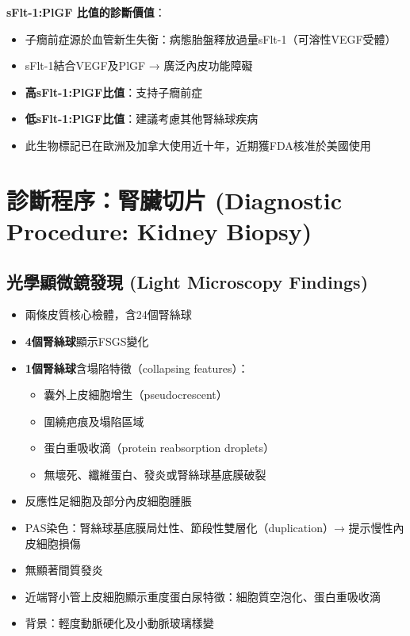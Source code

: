 \documentclass[12pt,a4paper]{article}
\begin{document}
\begin{importantbox}
\textbf{sFlt-1:PlGF 比值的診斷價值}：

\begin{itemize}[leftmargin=*]
    \item 子癇前症源於血管新生失衡：病態胎盤釋放過量sFlt-1（可溶性VEGF受體）
    \item sFlt-1結合VEGF及PlGF → 廣泛內皮功能障礙
    \item \textbf{高sFlt-1:PlGF比值}：支持子癇前症
    \item \textbf{低sFlt-1:PlGF比值}：建議考慮其他腎絲球疾病
    \item 此生物標記已在歐洲及加拿大使用近十年，近期獲FDA核准於美國使用
\end{itemize}
\end{importantbox}

\section{診斷程序：腎臟切片 (Diagnostic Procedure: Kidney Biopsy)}

\subsection{光學顯微鏡發現 (Light Microscopy Findings)}

\begin{itemize}[leftmargin=*]
    \item 兩條皮質核心檢體，含24個腎絲球
    \item \textbf{4個腎絲球}顯示FSGS變化
    \item \textbf{1個腎絲球}含塌陷特徵（collapsing features）：
    \begin{itemize}
        \item 囊外上皮細胞增生（pseudocrescent）
        \item 圍繞疤痕及塌陷區域
        \item 蛋白重吸收滴（protein reabsorption droplets）
        \item 無壞死、纖維蛋白、發炎或腎絲球基底膜破裂
    \end{itemize}
    \item 反應性足細胞及部分內皮細胞腫脹
    \item PAS染色：腎絲球基底膜局灶性、節段性雙層化（duplication）→ 提示慢性內皮細胞損傷
    \item 無顯著間質發炎
    \item 近端腎小管上皮細胞顯示重度蛋白尿特徵：細胞質空泡化、蛋白重吸收滴
    \item 背景：輕度動脈硬化及小動脈玻璃樣變
\end{itemize}
\end{document}
